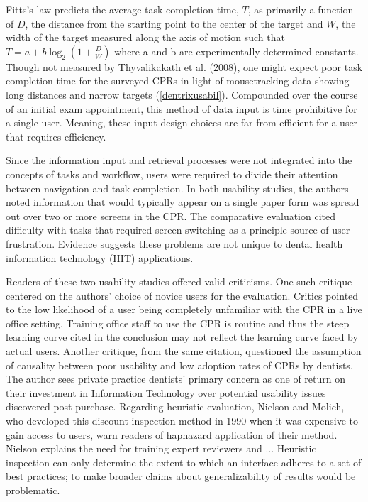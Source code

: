 \documentclass[11pt]{article}
\begin{document}
Fitts's law \cite{Fitts:1964vn,Fitts:2012kx} predicts the average task completion time, $T$, as primarily a function of $D$, the distance from the starting point to the center of the target and $W$, the width of the target measured along the axis of motion such that $ T = a + b \log_2 \left(1 + \frac{D}{W}\right) $ where a and b are experimentally determined constants. Though not measured by Thyvalikakath et al. (2008), one might expect poor task completion time for the surveyed CPRs in light of mousetracking data showing long distances and narrow targets (\ref{dentrixusabil}). Compounded over the course of an initial exam appointment, this method of data input is time prohibitive for a single user. Meaning, these input design choices are far from efficient for a user that requires efficiency.

Since the information input and retrieval processes were not integrated into the concepts of tasks and workflow, users were required to divide their attention between navigation and task completion. In both usability studies, the authors noted information that would typically appear on a single paper form was spread out over two or more screens in the CPR. The comparative evaluation cited difficulty with tasks that required screen switching as a principle source of user frustration. Evidence suggests these problems are not unique to dental health information technology (HIT) applications\cite{Ash2004Some-unintended,Rose2005Using-qualitati}.

Readers of these two usability studies offered valid criticisms\cite{Cockerell:2009fk}. One such critique centered on the authors' choice of novice users for the evaluation. Critics pointed to the low likelihood of a user being completely unfamiliar with the CPR in a live office setting. Training office staff to use the CPR is routine and thus the steep learning curve cited in the conclusion may not reflect the learning curve faced by actual users. Another critique, from the same citation, questioned the assumption of causality between poor usability and low adoption rates of CPRs by dentists. The author sees private practice dentists' primary concern as one of return on their investment in Information Technology over potential usability issues discovered post purchase. Regarding heuristic evaluation, Nielson and Molich, who developed this discount inspection method in 1990 when it was expensive to gain access to users, warn readers of haphazard application of their method. Nielson explains the need for training expert reviewers and ... Heuristic inspection can only determine the extent to which an interface adheres to a set of best practices; to make broader claims about generalizability of results would be problematic.
\end{document}
